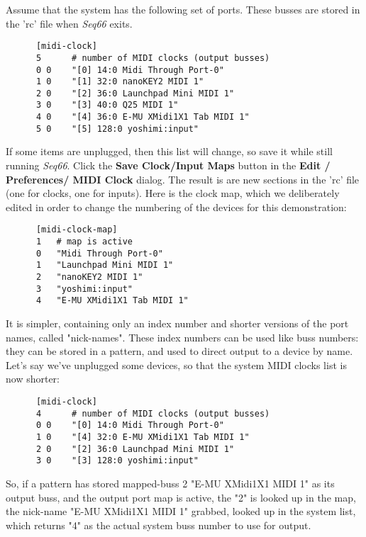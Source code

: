    Assume that the system has the following set of ports.  These busses are
   stored in the 'rc' file when \textsl{Seq66} exits.

   \begin{verbatim}
      [midi-clock]
      5      # number of MIDI clocks (output busses)
      0 0    "[0] 14:0 Midi Through Port-0"
      1 0    "[1] 32:0 nanoKEY2 MIDI 1"
      2 0    "[2] 36:0 Launchpad Mini MIDI 1"
      3 0    "[3] 40:0 Q25 MIDI 1"
      4 0    "[4] 36:0 E-MU XMidi1X1 Tab MIDI 1"
      5 0    "[5] 128:0 yoshimi:input"
   \end{verbatim}

   If some items are unplugged, then this list will change, so save it while
   still running \textsl{Seq66}.
   Click the
   \textbf{Save Clock/Input Maps} button in the
   \textbf{Edit / Preferences/ MIDI Clock} dialog. 
   The result is are new sections in the 'rc' file (one for clocks, one for
   inputs).  Here is the clock map, which we deliberately edited in order to
   change the numbering of the devices for this demonstration:

   \begin{verbatim}
      [midi-clock-map]
      1   # map is active
      0   "Midi Through Port-0"
      1   "Launchpad Mini MIDI 1"
      2   "nanoKEY2 MIDI 1"
      3   "yoshimi:input"
      4   "E-MU XMidi1X1 Tab MIDI 1"
   \end{verbatim}
   
   It is simpler, containing only an index number and shorter versions of the
   port names, called "nick-names".  These index numbers can be used like buss
   numbers: they can be stored in a pattern, and used to direct output to a
   device by name.  Let's say we've unplugged some devices, so that the system
   MIDI clocks list is now shorter:

   \begin{verbatim}
      [midi-clock]
      4      # number of MIDI clocks (output busses)
      0 0    "[0] 14:0 Midi Through Port-0"
      1 0    "[4] 32:0 E-MU XMidi1X1 Tab MIDI 1"
      2 0    "[2] 36:0 Launchpad Mini MIDI 1"
      3 0    "[3] 128:0 yoshimi:input"
   \end{verbatim}

   So, if a pattern has stored mapped-buss 2 "E-MU XMidi1X1 MIDI 1"
   as its output buss,
   and the output port map is active, the "2" is looked up in the map, the
   nick-name "E-MU XMidi1X1 MIDI 1" grabbed,
   looked up in the system list, which
   returns "4" as the actual system buss number to use for output.

